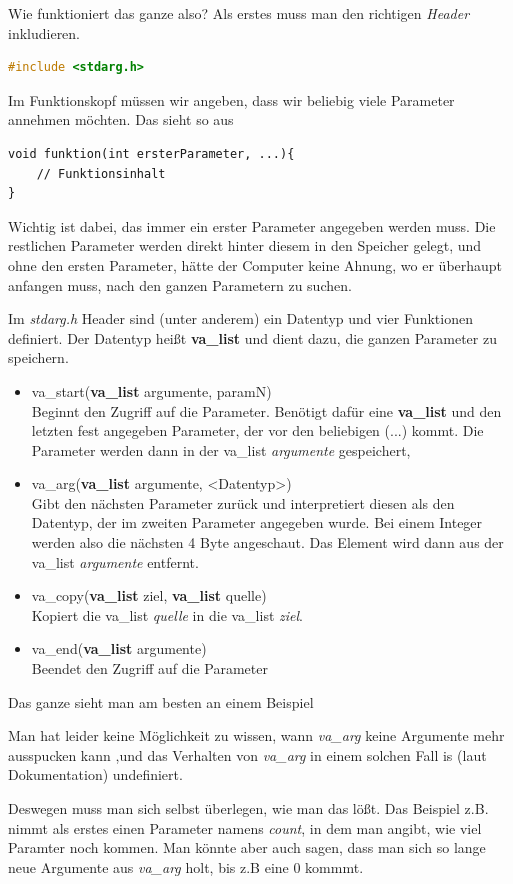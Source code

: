 \documentclass[c_worksheet.tex]{subfiles}
\begin{document}
Wie funktioniert das ganze also? Als erstes muss man den richtigen \emph{Header} inkludieren.

\begin{lstlisting}[language=c]
 #include <stdarg.h> 	
\end{lstlisting}  

Im Funktionskopf müssen wir angeben, dass wir beliebig viele Parameter annehmen möchten. Das sieht so aus

\begin{lstlisting}
void funktion(int ersterParameter, ...){
	// Funktionsinhalt
}
\end{lstlisting}

Wichtig ist dabei, das immer ein erster Parameter angegeben werden muss. Die restlichen Parameter werden direkt hinter diesem in den Speicher gelegt, und ohne den ersten Parameter, hätte der Computer keine Ahnung, wo er überhaupt anfangen muss, nach den ganzen Parametern zu suchen.

Im \emph{stdarg.h} Header sind (unter anderem) ein Datentyp und vier Funktionen definiert. Der Datentyp heißt \textbf{va\_list} und dient dazu, die ganzen Parameter zu speichern.


\begin{itemize}
	\item va\_start(\textbf{va\_list} argumente, paramN) \\
	Beginnt den Zugriff auf die Parameter. Benötigt dafür eine \textbf{va\_list} und den letzten fest angegeben Parameter, der vor den beliebigen (...) kommt. Die Parameter werden dann in der va\_list \emph{argumente} gespeichert,
	\item va\_arg(\textbf{va\_list} argumente, <Datentyp>) \\
	Gibt den nächsten Parameter zurück und interpretiert diesen als den Datentyp, der im zweiten Parameter angegeben wurde. Bei einem Integer werden also die nächsten 4 Byte angeschaut. Das Element wird dann aus der va\_list \emph{argumente} entfernt.
	\item va\_copy(\textbf{va\_list} ziel, \textbf{va\_list} quelle) \\
	Kopiert die va\_list \emph{quelle} in die va\_list \emph{ziel}.
	\item va\_end(\textbf{va\_list} argumente) \\
	Beendet den Zugriff auf die Parameter
\end{itemize}

Das ganze sieht man am besten an einem Beispiel



Man hat leider keine Möglichkeit zu wissen, wann \emph{va\_arg} keine Argumente mehr ausspucken kann ,und das Verhalten von \emph{va\_arg} in einem solchen Fall is (laut Dokumentation) undefiniert.

Deswegen muss man sich selbst überlegen, wie man das lößt. Das Beispiel z.B. nimmt als erstes einen Parameter namens \emph{count}, in dem  man angibt, wie viel Paramter noch kommen. Man könnte aber auch sagen, dass man sich so lange neue Argumente aus \emph{va\_arg} holt, bis z.B eine 0 kommmt.
\end{document}
